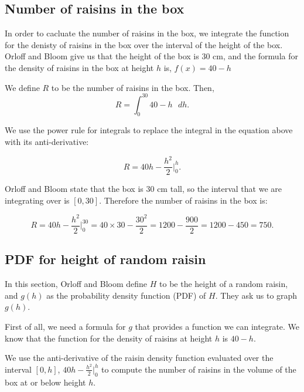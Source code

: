 \documentclass[a4paper,11pt]{article}
\begin{document}
\subsection{Number of raisins in the box}
In order to cacluate the number of raisins in the box, we integrate the function
for the denisty of raisins in the box over the interval of the height of the
box. Orloff and Bloom give us that the height of the box is $30$ cm, and the
formula for the density of raisins in the box at height $h$ is,
$f \left( x \right) = 40 -h $

We define $R$ to be the number of raisins in the box. Then,
\begin{equation}
	R = \int_{0}^{30} 40 -h \text{ } dh.
\end{equation}

We use the power rule for integrals \cite{basicInt} to replace the integral
in the equation above with its anti-derivative:

\begin{equation}
	R = 40h - \frac{h^{2}}{2} \bigg\rvert_{0}^{h}.
\end{equation}

Orloff and Bloom state that the box is 30 cm tall, so the interval that we
are integrating over is $\left[0, 30 \right]$.  Therefore the number of raisins
in the box is:

\begin{equation}
	R = 40h - \frac{h^{2}}{2} \bigg\rvert_{0}^{30}
	= 40 \times 30 - \frac{30^{2}}{2} = 1200 - \frac{900}{2} = 1200 - 450 = 750.
\end{equation}

\subsection{PDF for height of random raisin}

In this section, Orloff and Bloom define $H$ to be the height of a random
raisin, and $g \left( h \right)$ as the probability density function (PDF) of
$H$.  They ask us to graph $g \left( h \right)$.

First of all, we need a formula for $g$ that provides a function we can
integrate.  We know that the function for the density of raisins at height
$h$ is $40 - h$.

We use the anti-derivative of the raisin density function evaluated over
the interval $\left[ 0, h \right]$, $40h - \frac{h^{2}}{2} \bigg\rvert_{0}^{h}$
to compute the number of raisins in the volume of the box at or below height
$h$.
\end{document}
